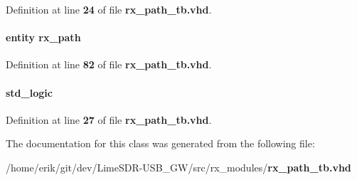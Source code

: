 Definition at line {\bf 24} of file {\bf rx\+\_\+path\+\_\+tb.\+vhd}.

\paragraph[{phsft}]{ {\bfseries \textcolor{keywordflow}{entity}\textcolor{vhdlchar}{ }\textcolor{vhdlchar}{rx\+\_\+path}\textcolor{vhdlchar}{ }} \hspace{0.3cm}{\ttfamily [Instantiation]}}\label{classrx__path__tb_1_1tb__behave_a1bdbc39efa78b3d9eda3bb373ca899e6}


Definition at line {\bf 82} of file {\bf rx\+\_\+path\+\_\+tb.\+vhd}.

\paragraph[{reset\+\_\+n}]{ {\bfseries \textcolor{comment}{std\+\_\+logic}\textcolor{vhdlchar}{ }} \hspace{0.3cm}{\ttfamily [Signal]}}\label{classrx__path__tb_1_1tb__behave_a1f070fd63a3a7fa45c907335ea870c5b}


Definition at line {\bf 27} of file {\bf rx\+\_\+path\+\_\+tb.\+vhd}.



The documentation for this class was generated from the following file\+:\begin{DoxyCompactItemize}
\item 
/home/erik/git/dev/\+Lime\+S\+D\+R-\/\+U\+S\+B\+\_\+\+G\+W/src/rx\+\_\+modules/{\bf rx\+\_\+path\+\_\+tb.\+vhd}\end{DoxyCompactItemize}
